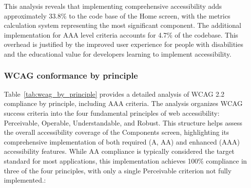 
This analysis reveals that implementing comprehensive accessibility adds approximately 33.8\% to the code base of the Home screen, with the metrics calculation system representing the most significant component. The additional implementation for AAA level criteria accounts for 4.7\% of the codebase. This overhead is justified by the improved user experience for people with disabilities and the educational value for developers learning to implement accessibility.

\subsubsection{WCAG conformance by principle}

Table~\ref{tab:wcag_by_principle} provides a detailed analysis of WCAG 2.2 compliance by principle, including AAA criteria. The analysis organizes WCAG success criteria into the four fundamental principles of web accessibility: Perceivable, Operable, Understandable, and Robust. This structure helps assess the overall accessibility coverage of the Components screen, highlighting its comprehensive implementation of both required (A, AA) and enhanced (AAA) accessibility features. While AA compliance is typically considered the target standard for most applications, this implementation achieves 100\% compliance in three of the four principles, with only a single Perceivable criterion not fully implemented.:

